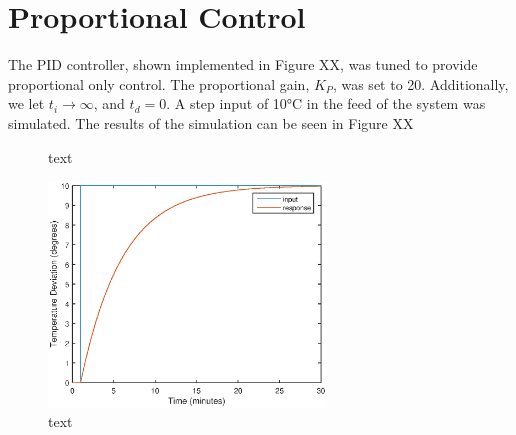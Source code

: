 \documentclass{article}
\begin{document}

\section{Proportional Control}
The PID controller, shown implemented in Figure XX, was tuned to provide proportional only control. The proportional gain, $K_P$, was set to 20. Additionally, we let $t_i \rightarrow \infty$, and $t_d = 0$. A step input of 10$\si{\degreeCelsius}$ in the feed of the system was simulated. The results of the simulation can be seen in Figure XX
\begin{figure}
\begin{minipage}{0.45\textwidth}
\centering
\caption{text}
\end{minipage}
\hspace{1cm}
\begin{minipage}{0.45\textwidth}
\centering
\includegraphics[height=6cm]{1a_sim}
\caption{text}
\end{minipage}
\end{figure} 
\end{document}
